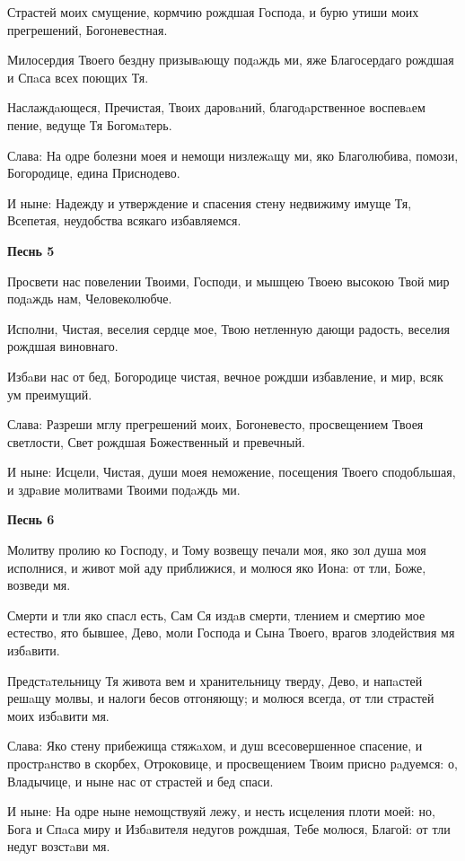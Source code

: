 Страстей моих смущение, кормчию рождшая Господа, и бурю утиши моих прегрешений, Богоневестная.


Милосердия Твоего бездну призывaющу подaждь ми, яже Благосердаго рождшая и Спaса всех поющих Тя.


Наслаждaющеся, Пречистая, Твоих даровaний, благодaрственное воспевaем пение, ведуще Тя Богомaтерь.


Слава: На одре болезни моея и немощи низлежaщу ми, яко Благолюбива, помози, Богородице, едина Приснодево.


И ныне: Надежду и утверждение и спасения стену недвижиму имуще Тя, Всепетая, неудобства всякаго избавляемся.


\medskip
\bfseries Песнь 5\normalfont{}\nopagebreak


Просвети нас повелении Твоими, Господи, и мышцею Твоею высокою Твой мир подaждь нам, Человеколюбче.

Исполни, Чистая, веселия сердце мое, Твою нетленную дающи радость, веселия рождшая виновнаго.

Избaви нас от бед, Богородице чистая, вечное рождши избавление, и мир, всяк ум преимущий.

Слава: Разреши мглу прегрешений моих, Богоневесто, просвещением Твоея светлости, Свет рождшая Божественный и превечный.

И ныне: Исцели, Чистая, души моея неможение, посещения Твоего сподобльшая, и здрaвие молитвами Твоими подaждь ми.


\medskip
\bfseries Песнь 6\normalfont{}\nopagebreak


Молитву пролию ко Господу, и Тому возвещу печали моя, яко зол душа моя исполнися, и живот мой аду приближися, и молюся яко Иона: от тли, Боже, возведи мя.


Смерти и тли яко спасл есть, Сам Ся издaв смерти, тлением и смертию мое естество, ято бывшее, Дево, моли Господа и Сына Твоего, врагов злодействия мя избaвити.


Предстaтельницу Тя живота вем и хранительницу тверду, Дево, и напaстей решaщу молвы, и налоги бесов отгоняющу; и молюся всегда, от тли страстей моих избaвити мя.


Слава: Яко стену прибежища стяжaхом, и душ всесовершенное спасение, и прострaнство в скорбех, Отроковице, и просвещением Твоим присно рaдуемся: о, Владычице, и ныне нас от страстей и бед спаси.


И ныне: На одре ныне немощствуяй лежу, и несть исцеления плоти моей: но, Бога и Спaса миру и Избaвителя недугов рождшая, Тебе молюся, Благой: от тли недуг возстaви мя.


